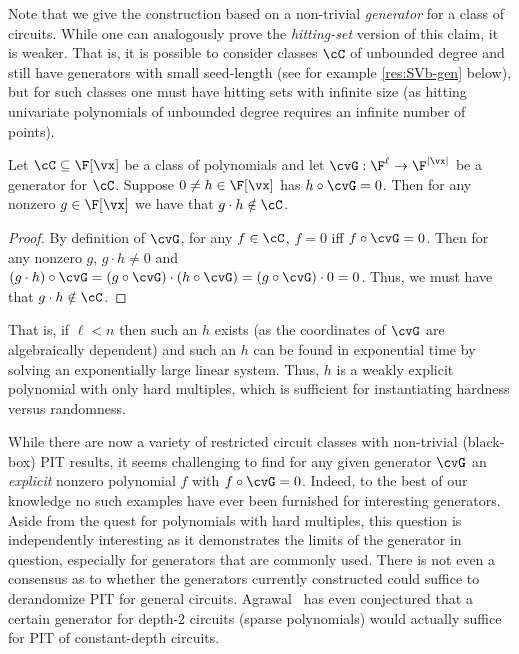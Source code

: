 \documentclass{toc}
\begin{document}
%



Note that we give the construction based on a non-trivial \emph{generator} for a class of circuits. While one can analogously prove the \emph{hitting-set} version of this claim, it is weaker.  That is, it is possible to consider classes $\cC$ of unbounded degree and still have generators with small seed-length (see for example \autoref{res:SVb-gen} below), but for such classes one must have hitting sets with infinite size (as hitting univariate polynomials of unbounded degree requires an infinite number of points).

\begin{lemma}\label{res:generator_to_lbs-mult}
        Let $\cC\subseteq\F[\vx]$ be a class of polynomials and let $\cvG:\F^\ell\to\F^{|\vx|}$ be a generator for $\cC$.  Suppose $0\ne h\in\F[\vx]$ has $h\circ \cvG=0$.  Then for any nonzero $g\in\F[\vx]$ we have that $g\cdot h\notin \cC$.
\end{lemma}
\begin{proof}
        By definition of $\cvG$, for any $f\in\cC$, $f=0$ iff $f\circ \cvG=0$.  Then for any nonzero $g$, $g\cdot h\ne 0$ and $(g\cdot h)\circ \cvG=(g\circ \cvG)\cdot (h\circ \cvG)=(g\circ \cvG) \cdot 0=0$.  Thus, we must have that $g\cdot h\notin\cC$.
\end{proof}

That is, if $\ell<n$ then such an $h$ exists (as the coordinates of $\cvG$ are algebraically dependent) and such an $h$ can be found in exponential time by solving an %
exponentially large
linear system.  Thus, $h$ is a %
weakly explicit %
polynomial with only hard multiples, which is sufficient for instantiating hardness versus randomness.

While there are now a variety of restricted circuit classes with non-trivial (black-box) PIT results, it seems challenging to find for any given generator $\cvG$ an \emph{explicit} nonzero polynomial $f$ with $f\circ \cvG=0$.  Indeed, to the best of our knowledge no such examples have ever been furnished for interesting generators. Aside from the quest for polynomials with hard multiples, this question is independently interesting as it demonstrates the limits of the generator in question, especially for generators that are commonly used.  There is not even a consensus as to whether the generators currently constructed could suffice to derandomize PIT for general circuits. Agrawal~\cite{Agrawal05} has even conjectured that a certain generator for depth-2 circuits (sparse polynomials) would actually suffice for PIT of constant-depth circuits.
\end{document}
